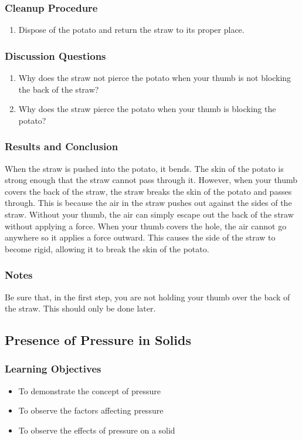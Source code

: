 \subsubsection*{Cleanup Procedure}
\begin{enumerate}
\item{Dispose of the potato and return the straw to its proper place.}
\end{enumerate}

\subsubsection*{Discussion Questions}
\begin{enumerate}
\item{Why does the straw not pierce the potato when your thumb is not blocking the back of the straw?}
\item{Why does the straw pierce the potato when your thumb is blocking the potato?}
\end{enumerate}

\subsubsection*{Results and Conclusion}
When the straw is pushed into the potato, it bends. The skin of the potato is strong enough that the straw cannot pass through it. However, when your thumb covers the back of the straw, the straw breaks the skin of the potato and passes through. This is because the air in the straw pushes out against the sides of the straw. Without your thumb, the air can simply escape out the back of the straw without applying a force. When your thumb covers the hole, the air cannot go anywhere so it applies a force outward. This causes the side of the straw to become rigid, allowing it to break the skin of the potato.

\subsubsection*{Notes}
Be sure that, in the first step, you are not holding your thumb over the back of the straw. This should only be done later.

\subsection{Presence of Pressure in Solids}

\subsubsection*{Learning Objectives}
\begin{itemize}
\item{To demonstrate the concept of pressure}
\item{To observe the factors affecting pressure} 
\item{To observe the effects of pressure on a solid} 
\end{itemize}

